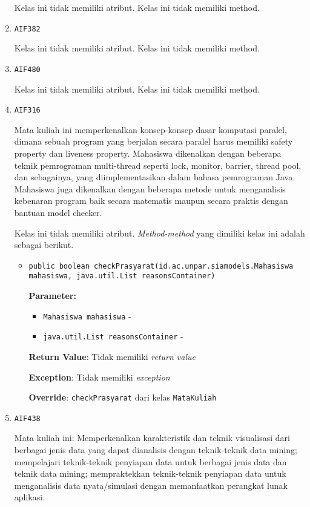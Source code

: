 \documentclass{article}
\begin{document}
\begin{enumerate}
Kelas ini tidak memiliki atribut. Kelas ini tidak memiliki method. \item \texttt{AIF382}



Kelas ini tidak memiliki atribut. Kelas ini tidak memiliki method. \item \texttt{AIF480}



Kelas ini tidak memiliki atribut. Kelas ini tidak memiliki method. \item \texttt{AIF316}

Mata kuliah ini memperkenalkan konsep-konsep dasar komputasi paralel, dimana sebuah 
 program yang berjalan secara paralel harus memiliki safety property dan liveness property. 
 Mahasiswa dikenalkan dengan beberapa teknik pemrograman multi-thread
 seperti lock, monitor, barrier, thread pool, dan sebagainya, yang diimplementasikan 
 dalam bahasa pemrograman Java. Mahasiswa juga dikenalkan dengan beberapa metode untuk 
 menganalisis kebenaran program baik secara matematis maupun secara praktis dengan bantuan 
 model checker.

Kelas ini tidak memiliki atribut. \textit{Method-method} yang dimiliki kelas ini adalah sebagai berikut.
\begin{itemize}
\item \texttt{public boolean checkPrasyarat(id.ac.unpar.siamodels.Mahasiswa mahasiswa, java.util.List reasonsContainer)}

\textbf{Parameter:}
\begin{itemize}
\item \texttt{Mahasiswa mahasiswa} - 
\item \texttt{java.util.List reasonsContainer} - 
\end{itemize}
\textbf{Return Value}: Tidak memiliki \textit{return value}

\textbf{Exception}: Tidak memiliki \textit{exception}

\textbf{Override}: \texttt{checkPrasyarat} dari kelas \texttt{MataKuliah}

\end{itemize}
\item \texttt{AIF438}

Mata kuliah ini: Memperkenalkan karakteristik dan teknik visualisasi dari
 berbagai jenis data yang dapat dianalisis dengan teknik-teknik data mining;
 mempelajari teknik-teknik penyiapan data untuk berbagai jenis data dan teknik
 data mining; mempraktekkan teknik-teknik penyiapan data untuk menganalisis
 data nyata/simulasi dengan memanfaatkan perangkat lunak aplikasi.


\end{enumerate}
\end{document}
